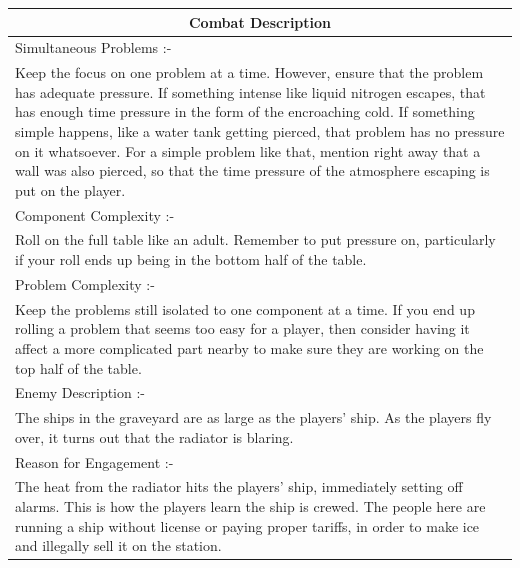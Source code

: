 \documentclass[a4paper]{article}
\begin{document}
\begin{minipage}[t]{0.5\linewidth}
\begin{tabular}[t]{| p{7cm} |}
\toprule
\multicolumn{1}{|c|}{Combat Description} \\
\midrule
Simultaneous Problems :- \\
Keep the focus on one problem at a time. However, ensure that the problem has adequate pressure. If something intense like liquid nitrogen escapes, that has enough time pressure in the form of the encroaching cold. If something simple happens, like a water tank getting pierced, that problem has no pressure on it whatsoever. For a simple problem like that, mention right away that a wall was also pierced, so that the time pressure of the atmosphere escaping is put on the player. \\	
\midrule
Component Complexity :- \\
Roll on the full table like an adult. Remember to put pressure on, particularly if your roll ends up being in the bottom half of the table. \\
\midrule
Problem Complexity :- \\
Keep the problems still isolated to one component at a time. If you end up rolling a problem that seems too easy for a player, then consider having it affect a more complicated part nearby to make sure they are working on the top half of the table. \\
\midrule
Enemy Description :- \\
The ships in the graveyard are as large as the players' ship. As the players fly over, it turns out that the radiator is blaring. \\
\midrule
Reason for Engagement :- \\
The heat from the radiator hits the players' ship, immediately setting off alarms. This is how the players learn the ship is crewed. The people here are running a ship without license or paying proper tariffs, in order to make ice and illegally sell it on the station. \\
\bottomrule
\end{tabular}
\end{minipage}
\end{document}
